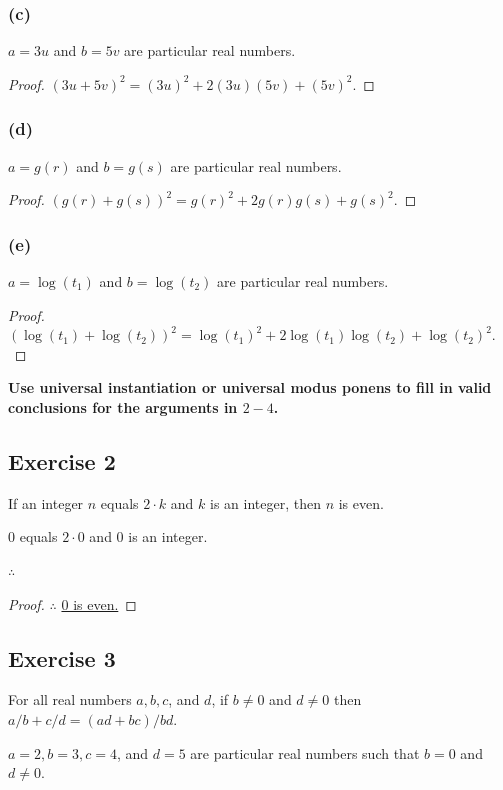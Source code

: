 \documentclass[14pt]{extarticle}
\newcommand{\fbl}{\underline{\hspace{1cm}}\,\,}
\begin{document}
\subsubsection{(c)}
$a = 3u$ and $b = 5v$ are particular real numbers.

\begin{proof}
$(3u + 5v)^2 = (3u)^2 + 2(3u)(5v) + (5v)^2. $
\end{proof}

\subsubsection{(d)}
$a = g(r)$ and $b = g(s)$ are particular real numbers.

\begin{proof}
$(g(r) + g(s))^2 = g(r)^2 + 2g(r)g(s) + g(s)^2. $
\end{proof}

\subsubsection{(e)}
$a = \log(t_1)$ and $b = \log(t_2)$ are particular real numbers.

\begin{proof}
$(\log(t_1) + \log(t_2))^2 = \log(t_1)^2 + 2\log(t_1)\log(t_2) + \log(t_2)^2. $
\end{proof}

{\bf \color{cyan} Use universal instantiation or universal modus ponens to fill in valid conclusions for the arguments in $2-4$.}

\subsection{Exercise 2}
If an integer $n$ equals $2\cdot k$ and $k$ is an integer, then $n$ is even.

0 equals $2\cdot 0$ and 0 is an integer.

$\therefore$ \fbl

\begin{proof}
$\therefore$ \underline{0 is even.}
\end{proof}

\subsection{Exercise 3}
For all real numbers $a, b, c$, and $d$, if $b \neq 0$ and $d \neq 0$ then $a/b + c/d = (ad + bc)/bd$.

$a = 2, b = 3, c = 4$, and $d = 5$ are particular real numbers such that $b = 0$ and $d \neq 0$.
\end{document}
